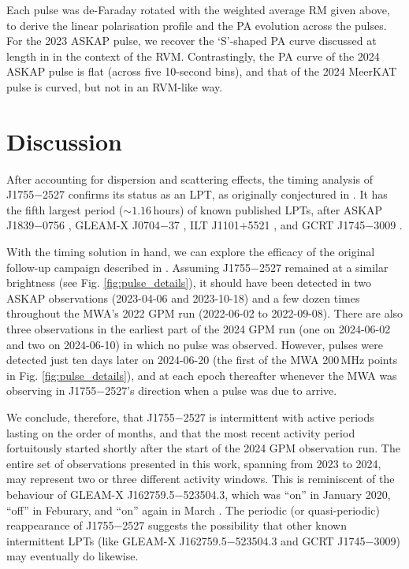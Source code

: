 \documentclass[fleqn,usenatbib]{mnras}
\newcommand{\src}{J1755$-$2527}
\begin{document}
Each pulse was de-Faraday rotated with the weighted average RM given above, to derive the linear polarisation profile and the PA evolution across the pulses.
For the 2023 ASKAP pulse, we recover the `S'-shaped PA curve discussed at length in  in the context of the RVM.
Contrastingly, the PA curve of the 2024 ASKAP pulse is flat (across five 10-second bins), and that of the 2024 MeerKAT pulse is curved, but not in an RVM-like way.

\section{Discussion} \label{sec:discussion}

After accounting for dispersion and scattering effects, the timing analysis of \src{} confirms its status as an LPT, as originally conjectured in .
It has the fifth largest period (${\sim}1.16\,$hours) of known published LPTs, after ASKAP J1839$-$0756 \citep[$6.45\,$hours;][]{Lee2025}, GLEAM-X J0704$-$37 \citep[$2.92\,$hours;][]{2024arXiv240815757H, 2025arXiv250103315R}, ILT J1101+5521 \citep[$2.09\,$hours;][]{deRuiter2025}, and GCRT J1745$-$3009 \citep[$1.28\,$hours;][]{2005Natur.434...50H}.

With the timing solution in hand, we can explore the efficacy of the original follow-up campaign described in .
Assuming \src{} remained at a similar brightness (see Fig. \ref{fig:pulse_details}), it should have been detected in two ASKAP observations (2023-04-06 and 2023-10-18) and a few dozen times throughout the MWA's 2022 GPM run (2022-06-02 to 2022-09-08).
There are also three observations in the earliest part of the 2024 GPM run (one on 2024-06-02 and two on 2024-06-10) in which no pulse was observed.
However, pulses were detected just ten days later on 2024-06-20 (the first of the MWA 200\,MHz points in Fig. \ref{fig:pulse_details}), and at each epoch thereafter whenever the MWA was observing in \src{}'s direction when a pulse was due to arrive.

We conclude, therefore, that \src{} is intermittent with active periods lasting on the order of months, and that the most recent activity period fortuitously started shortly after the start of the 2024 GPM observation run.
The entire set of observations presented in this work, spanning from 2023 to 2024, may represent two or three different activity windows.
This is reminiscent of the behaviour of GLEAM-X J162759.5$-$523504.3, which was ``on'' in January 2020, ``off'' in Feburary, and ``on'' again in March \citep{2022Natur.601..526H}.
The periodic (or quasi-periodic) reappearance of \src{} suggests the possibility that other known intermittent LPTs (like GLEAM-X J162759.5$-$523504.3 and GCRT J1745$-$3009) may eventually do likewise.
\end{document}
